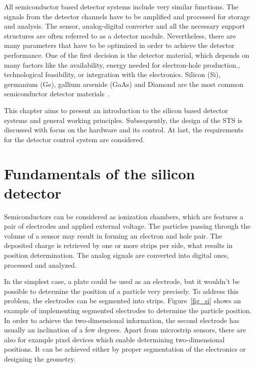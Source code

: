
All semiconductor based detector systems include very similar functions. The signals from the detector channels have to be amplified and processed for storage and analysis. The sensor, analog-digital converter and all the necessary support structures are often referred to as a detector module. Nevertheless, there are many parameters that have to be optimized in order to achieve the detector performance. One of the first decision is the detector material, which depends on many factors like the availability, energy needed for electron-hole production., technological feasibility, or integration with the electronics. Silicon (Si), germanium (Ge), gallium arsenide (GaAs) and Diamond are the most common semiconductor detector materials~\cite{Lutz:1999wg,Hartmann:2017gzy}.


This chapter aims to present an introduction to the silicon based detector systems and general working principles. Subsequently, the design of the \gls{STS} is discussed with focus on the hardware and its control. At last, the requirements for the detector control system are considered. 

\section{Fundamentals of the silicon detector}
Semiconductors can be considered as ionization chambers, which are features a pair of electrodes and applied external voltage. The particles passing through the volume of a sensor may result in forming an electron and hole pair. The deposited charge is retrieved by one or more strips per side, what results in position determination. The analog signals are converted into digital ones, processed and analyzed.

In the simplest case, a plate could be used as an electrode, but it wouldn't be possible to determine the position of a particle very precisely. To address this problem, the electrodes can be segmented into strips. Figure~\ref{fig_si} shows an example of implementing segmented electrodes to determine the particle position. In order to achieve the two-dimensional information, the second electrode has usually an inclination of a few degrees. Apart from microstrip sensors, there are also for example pixel devices which enable determining two-dimensional positions. It can be achieved either by proper segmentation of the electronics or designing the geometry.  

